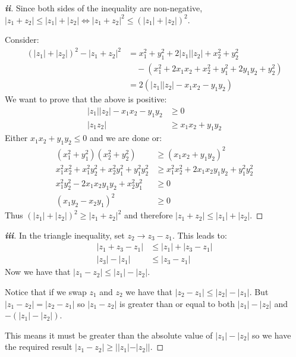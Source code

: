 \documentclass[../main.tex]{subfiles}
\begin{document}
\begin{proof}[\textbf{ii}]
  Since both sides of the inequality are non-negative, $|z_1 + z_2| \leq |z_1| + |z_2| \iff |z_1 + z_2|^2 \leq (|z_1| + |z_2|)^2$.

  Consider:
  \begin{align*}
      (|z_1| + |z_2|)^2 - |z_1 + z_2|^2 &= x^{2}_{1} + y^{2}_{1} + 2|z_1|| z_2| + x^{2}_{2} + y^{2}_{2} \\
                                        & \quad - (x^{2}_{1} + 2x_1x_2 + x^{2}_{2} + y^{2}_{1} + 2y_1y_2 + y^{2}_{2})\\
                                        &= 2(|z_1||z_2| - x_1 x_2 - y_1 y_2)
  \end{align*}
  We want to prove that the above is positive:
  \begin{align*}
    |z_1||z_2| - x_1 x_2 - y_1 y_2 &\geq 0 \\
    |z_1 z_2| &\geq x_1 x_2 + y_1 y_2
  \end{align*}
  Either $x_1 x_2 + y_1 y_2 \leq 0$ and we are done or:
  \begin{align*}
    (x^{2}_{1} + y^{2}_{1})(x^{2}_{2} + y^{2}_{2}) &\geq (x_1 x_2 + y_1 y_2)^2 \\
    x^{2}_{1} x^{2}_{2} + x^{2}_{1} y^{2}_{2} + x^{2}_{2} y^{2}_{1} + y^{2}_{1} y^{2}_{2}&\geq x^{2}_{1} x^{2}_{2} + 2x_1 x_2 y_1 y_2 + y^{2}_{1} y^{2}_{2} \\
    x^{2}_{1} y^{2}_{2} - 2x_1 x_2 y_1 y_2 + x^{2}_{2} y^{2}_{1} &\geq 0 \\
    (x_1 y_2 - x_2 y_1)^2 &\geq 0
  \end{align*}
  Thus $(|z_1| + |z_2|)^2 \geq |z_1 + z_2|^2$ and therefore $|z_1 + z_2| \leq |z_1| + |z_2|$.
\end{proof}
\begin{proof}[\textbf{iii}]
  In the triangle inequality, set $z_2 \to z_3 - z_1$.
  This leads to:
  \begin{align*}
    |z_1 + z_3 - z_1| &\leq |z_1| + |z_3 - z_1|\\
    |z_3| - |z_1| &\leq |z_3 - z_1|
  \end{align*}
  Now we have that $|z_1 - z_2| \leq |z_1| - |z_2|$.

  Notice that if we swap $z_1$ and $z_2$ we have that $|z_2 - z_1| \leq |z_2| - |z_1|$.
  But $|z_1 - z_2| = |z_2 - z_1|$ so $|z_1 - z_2|$ is greater than or equal to both $|z_1| - |z_2|$ and $-(|z_1| - |z_2|)$.

  This means it must be greater than the absolute value of $|z_1| - |z_2|$ so we have the required result $|z_1 - z_2| \geq ||z_1| - |z_2||$.
\end{proof}
\end{document}

